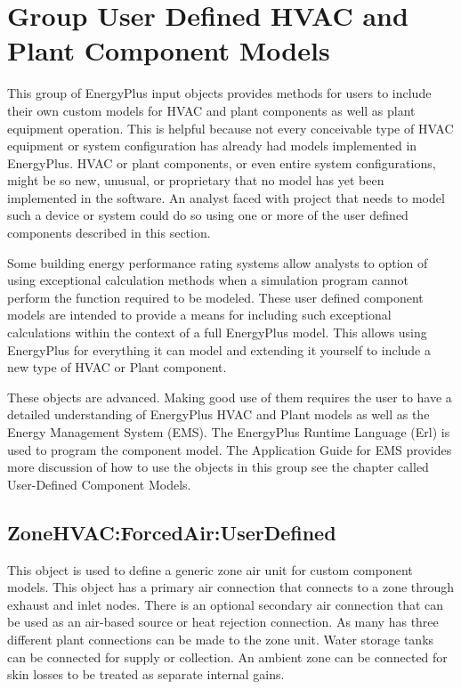 \section{Group User Defined HVAC and Plant Component Models}\label{group-user-defined-hvac-and-plant-component-models}

This group of EnergyPlus input objects provides methods for users to include their own custom models for HVAC and plant components as well as plant equipment operation. This is helpful because not every conceivable type of HVAC equipment or system configuration has already had models implemented in EnergyPlus. HVAC or plant components, or even entire system configurations, might be so new, unusual, or proprietary that no model has yet been implemented in the software. An analyst faced with project that needs to model such a device or system could do so using one or more of the user defined components described in this section.

Some building energy performance rating systems allow analysts to option of using exceptional calculation methods when a simulation program cannot perform the function required to be modeled. These user defined component models are intended to provide a means for including such exceptional calculations within the context of a full EnergyPlus model. This allows using EnergyPlus for everything it can model and extending it yourself to include a new type of HVAC or Plant component.

These objects are advanced. Making good use of them requires the user to have a detailed understanding of EnergyPlus HVAC and Plant models as well as the Energy Management System (EMS). The EnergyPlus Runtime Language (Erl) is used to program the component model. The Application Guide for EMS provides more discussion of how to use the objects in this group see the chapter called User-Defined Component Models.

\subsection{ZoneHVAC:ForcedAir:UserDefined}\label{zonehvacforcedairuserdefined}

This object is used to define a generic zone air unit for custom component models. This object has a primary air connection that connects to a zone through exhaust and inlet nodes. There is an optional secondary air connection that can be used as an air-based source or heat rejection connection. As many has three different plant connections can be made to the zone unit. Water storage tanks can be connected for supply or collection. An ambient zone can be connected for skin losses to be treated as separate internal gains.

